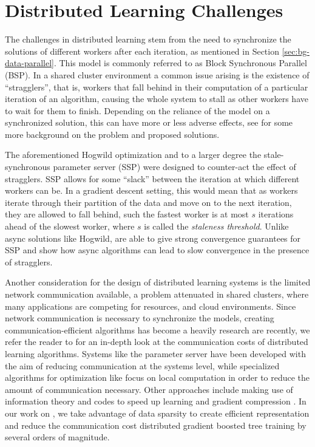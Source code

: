 \section{Distributed Learning Challenges}
\label{sec:bg-ml-challenges}

The challenges in distributed learning stem from the need to synchronize the solutions of different workers
after each iteration,
as mentioned in Section \ref{sec:bg-data-parallel}. This model is commonly referred to as
Block Synchronous Parallel (BSP).
In a shared cluster environment a common issue arising is the existence of ``stragglers'', that is,
workers that fall behind in their computation of a particular iteration of an algorithm, causing
the whole system to stall as other workers have to wait for them to finish. Depending on the reliance
of the model on a synchronized solution, this can have more or less adverse effects, see
\cite{straggler-ml} for some more background on the problem and proposed solutions.

The aforementioned Hogwild optimization \cite{hogwild} and to a larger degree the stale-synchronous
parameter server (SSP) \cite{stale-sync-ps} were designed to counter-act the effect of stragglers.
SSP allows for some ``slack'' between the iteration at which different workers can be. In a gradient
descent setting, this would mean that as workers iterate through their partition of the data and move
on to the next iteration, they are allowed to fall behind, such the fastest worker is at most
$s$ iterations ahead of the slowest worker, where $s$ is called the \emph{staleness threshold}.
Unlike async solutions like Hogwild, \citet{stale-sync-ps} are able to give strong convergence
guarantees for SSP and show how async algorithms can lead to slow convergence in the presence of stragglers.

Another consideration for the design of distributed learning systems is the
limited network communication available, a problem attenuated in shared clusters,
where many applications are competing for resources, and cloud environments.
Since network communication is necessary to synchronize the models, creating
communication-efficient algorithms has become a heavily research are recently,
we refer the reader to \cite{optimization-communication-complexity} for an in-depth
look at the communication costs of distributed learning algorithms.
Systems like the parameter server have been developed with the aim of reducing communication \cite{muPS}
at the systems level,
while specialized algorithms for optimization like \cite{cocoa} focus on local computation
in order to reduce the amount of communication necessary. Other approaches include making use
of information theory and codes to speed up learning \cite{distributed-ml-codes} and gradient
compression \cite{gradient-compression}.
In our work on \blockgbt, we take advantage of data sparsity to create efficient representation
and reduce the communication cost distributed gradient boosted tree training by several orders
of magnitude.
